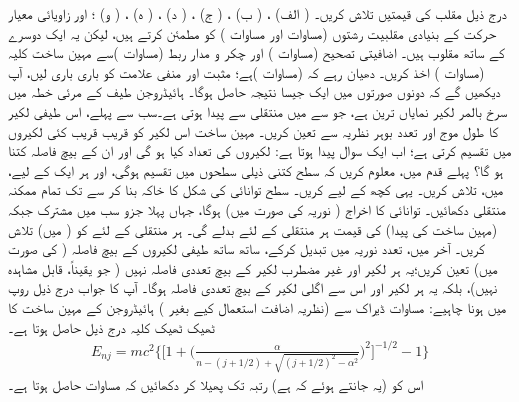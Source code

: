درج ذیل مقلب کی قیمتیں تلاش کریں۔
 ( الف) ، ( ب) ،
 ( ج) ، ( د) ،
 ( ه) ، ( و) ؛
   اور  زاویائی معیار حرکت کے بنیادی مقلبیت رشتوں (مساوات  اور مساوات ) کو مطمئن کرتے ہیں، لیکن یہ ایک دوسرے کے ساتھ مقلوب ہیں۔ 
اضافیتی تصحیح (مساوات ) اور چکر و مدار ربط (مساوات )سے مہین ساخت کلیہ (مساوات ) اخذ کریں۔  دھیان رہے کہ  (مساوات )ہے؛ مثبت اور منفی علامت کو باری باری لیں، آپ دیکھیں گے کہ دونوں صورتوں میں ایک جیسا نتیجہ حاصل ہوگا۔ 
 ہائیڈروجن طیف کے مرئی خطہ میں سرخ بالمر لکیر نمایاں ترین ہے، جو  سے  میں منتقلی سے پیدا ہوتی ہے۔سب سے پہلے، اس طیفی لکیر کا طول موج اور تعدد بوہر نظریہ سے تعین کریں۔ مہین ساخت اس لکیر کو قریب قریب کئی لکیروں میں تقسیم کرتی ہے؛ اب ایک سوال پیدا ہوتا ہے: لکیروں کی تعداد کیا ہو گی اور ان کے بیچ فاصلہ کتنا ہو گا؟  پہلے قدم میں، معلوم کریں کہ  سطح کتنی ذیلی سطحوں میں تقسیم ہوگی، اور ہر ایک کے لیے،  میں،  تلاش کریں۔ یہی کچھ  کے لیے کریں۔ سطح توانائی کی شکل کا خاکہ بنا کر  سے  تک تمام ممکنہ منتقلی دکھائیں۔ توانائی کا اخراج ( نوریہ کی صورت میں)  ہوگا، جہاں پہلا جزو سب میں مشترک جبکہ (مہین ساخت کی پیدا)  کی قیمت ہر منتقلی کے لئے بدلے گی۔ ہر منتقلی کے لئے  کو (  میں) تلاش کریں۔ آخر میں، تعدد نوریہ میں تبدیل کرکے، ساتھ ساتھ طیفی لکیروں کے بیچ فاصلہ ( کی صورت میں) تعین کریں؛یہ ہر لکیر اور غیر مضطرب لکیر کے بیچ تعددی فاصلہ نہیں ( جو یقیناً، قابل مشاہدہ نہیں)، بلکہ یہ ہر لکیر اور اس سے اگلی لکیر کے بیچ تعددی فاصلہ ہوگا۔ آپ کا جواب درج ذیل روپ میں ہونا چاہیے: 
مساوات ڈیراک سے (نظریہ اضافت استعمال کیے بغیر ) ہائیڈروجن کے مہین ساخت کا ٹھیک ٹھیک کلیہ درج ذیل حاصل ہوتا ہے۔
\begin{align*}
E_{nj} = mc^2 \Big \{ \big [ 1 + \big ( \frac{\alpha}{n - (j + 1/2 ) + \sqrt{(j +1/2)^2 - \alpha^2}} \big )^2 \big ]^{- 1/2} -1 \Big \}
\end{align*}
 اس کو (یہ جانتے ہوئے کہ  ہے)  رتبہ تک پھیلا کر دکھائیں کہ مساوات  حاصل ہوتا ہے۔ 


